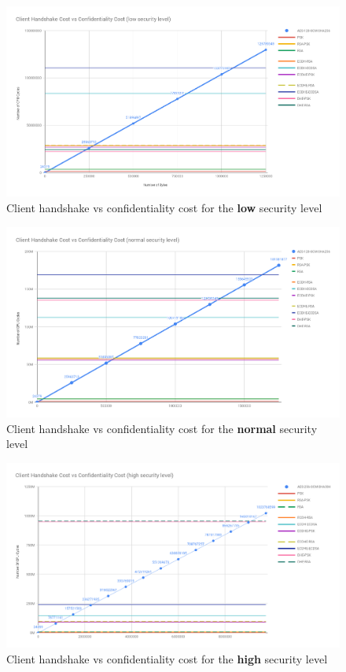 \begin{figure}
  \centering
  \includegraphics[width=1.0\textwidth]{img/cli_conf_hs_low.png}
  \centering \caption{\label{fig:cli-conf-hs-low} Client handshake vs confidentiality cost for the \textbf{low} security level}
\end{figure}

\begin{figure}
  \centering
  \includegraphics[width=1.0\textwidth]{img/cli_conf_hs_normal.png}
  \centering \caption{\label{fig:cli-conf-hs-normal} Client handshake vs confidentiality cost for the \textbf{normal} security level}
\end{figure}

\begin{figure}
  \centering
  \includegraphics[width=1.0\textwidth]{img/cli_conf_hs_high.png}
  \centering \caption{\label{fig:cli-conf-hs-high} Client handshake vs confidentiality cost for the \textbf{high} security level}
\end{figure}

